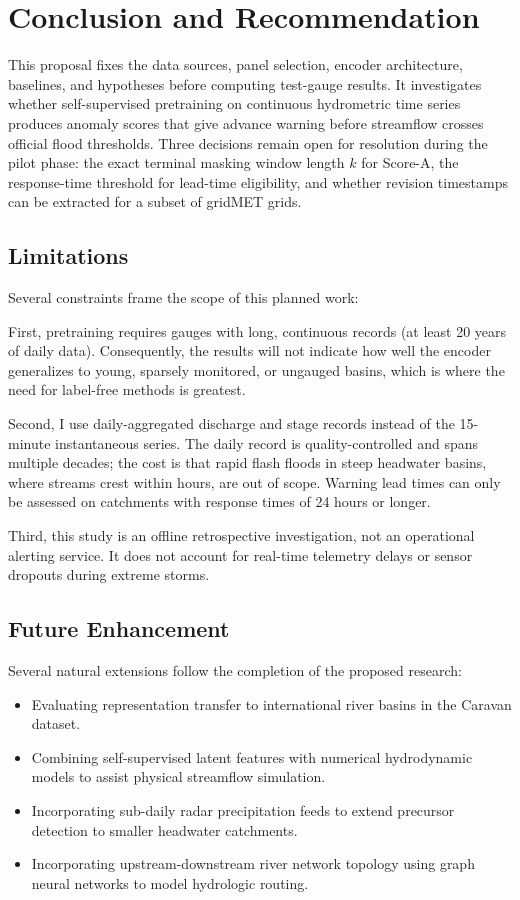 \documentclass[12pt]{report}
\begin{document}
\chapter{Conclusion and Recommendation}

This proposal fixes the data sources, panel selection, encoder architecture, baselines, and hypotheses before computing test-gauge results. It investigates whether self-supervised pretraining on continuous hydrometric time series produces anomaly scores that give advance warning before streamflow crosses official flood thresholds. Three decisions remain open for resolution during the pilot phase: the exact terminal masking window length $k$ for Score-A, the response-time threshold for lead-time eligibility, and whether revision timestamps can be extracted for a subset of gridMET grids.

\section{Limitations}

Several constraints frame the scope of this planned work:

First, pretraining requires gauges with long, continuous records (at least 20 years of daily data). Consequently, the results will not indicate how well the encoder generalizes to young, sparsely monitored, or ungauged basins, which is where the need for label-free methods is greatest.

Second, I use daily-aggregated discharge and stage records instead of the 15-minute instantaneous series. The daily record is quality-controlled and spans multiple decades; the cost is that rapid flash floods in steep headwater basins, where streams crest within hours, are out of scope. Warning lead times can only be assessed on catchments with response times of 24 hours or longer.

Third, this study is an offline retrospective investigation, not an operational alerting service. It does not account for real-time telemetry delays or sensor dropouts during extreme storms.

\section{Future Enhancement}

Several natural extensions follow the completion of the proposed research:

\begin{itemize}
  \item Evaluating representation transfer to international river basins in the Caravan dataset.
  \item Combining self-supervised latent features with numerical hydrodynamic models to assist physical streamflow simulation.
  \item Incorporating sub-daily radar precipitation feeds to extend precursor detection to smaller headwater catchments.
  \item Incorporating upstream-downstream river network topology using graph neural networks to model hydrologic routing.
\end{itemize}
\end{document}
